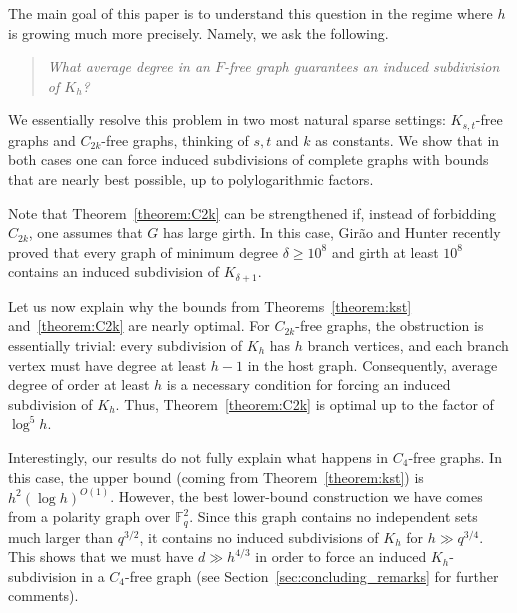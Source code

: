 \documentclass[10pt, a4paper]{article}
\newcommand{\PM}[1]{\textcolor{blue}{ $\blacktriangleright$\ {\sf PM: #1}\ 
  $\blacktriangleleft$ }}
\newtheorem{theorem}{Theorem}
\numberwithin{theorem}{section} %
\theoremstyle{remark}
\theoremstyle{definition}
\begin{document}
The main goal of this paper is to understand this question in the regime where $h$ is growing much more precisely. Namely, we ask the following.

\begin{quote}
\emph{What average degree in an $F$-free graph guarantees an induced subdivision of $K_h$?}
\end{quote}

We essentially resolve this problem in two most natural sparse settings: $K_{s,t}$-free graphs and $C_{2k}$-free graphs, thinking of $s, t$ and $k$ as constants. We show that in both cases one can force induced subdivisions of complete graphs with bounds that are nearly best possible, up to polylogarithmic factors.



\noindent
Note that Theorem~\ref{theorem:C2k} can be strengthened if, instead of forbidding $C_{2k}$, one assumes that $G$ has large girth. In this case, Gir\~ao and Hunter \cite{GiraoHunter26} recently proved that every graph of minimum degree $\delta\geq 10^8$ and girth at least $10^8$ contains an induced subdivision of $K_{\delta+1}$. 

Let us now explain why the bounds from Theorems~\ref{theorem:kst} and~\ref{theorem:C2k} are nearly optimal. For $C_{2k}$-free graphs, the obstruction is essentially trivial: every subdivision of $K_h$ has $h$ branch vertices, and each branch vertex must have degree at least $h-1$ in the host graph. Consequently, average degree of order at least $h$ is a necessary condition for forcing an induced subdivision of $K_h$. Thus, Theorem~\ref{theorem:C2k} is optimal up to the factor of $\log^5 h$. 

Interestingly, our results do not fully explain what happens in $C_4$-free graphs. In this case, the upper bound (coming from Theorem~\ref{theorem:kst}) is $h^2(\log h)^{O(1)}$. However, the best lower-bound construction we have comes from a polarity graph over $\mathbb{F}_q^2$. Since this graph contains no independent sets much larger than $q^{3/2}$, it contains no induced subdivisions of $K_h$ for $h\gg q^{3/4}$. This shows that we must have $d\gg h^{4/3}$ in order to force an induced $K_h$-subdivision in a $C_4$-free graph (see Section~\ref{sec:concluding_remarks} for further comments).
\end{document}
